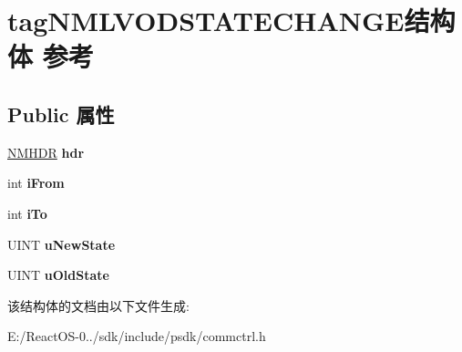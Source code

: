 \hypertarget{structtag_n_m_l_v_o_d_s_t_a_t_e_c_h_a_n_g_e}{}\section{tag\+N\+M\+L\+V\+O\+D\+S\+T\+A\+T\+E\+C\+H\+A\+N\+G\+E结构体 参考}
\label{structtag_n_m_l_v_o_d_s_t_a_t_e_c_h_a_n_g_e}
\subsection*{Public 属性}
\begin{DoxyCompactItemize}
\item 
\mbox{\label{structtag_n_m_l_v_o_d_s_t_a_t_e_c_h_a_n_g_e_af089e91bad1079a82aee94b51926b203}} 
\hyperlink{structtag_n_m_h_d_r}{N\+M\+H\+DR} {\bfseries hdr}
\item 
\mbox{\label{structtag_n_m_l_v_o_d_s_t_a_t_e_c_h_a_n_g_e_af0a5ce1acd62522e4bf8b36e53c3986a}} 
int {\bfseries i\+From}
\item 
\mbox{\label{structtag_n_m_l_v_o_d_s_t_a_t_e_c_h_a_n_g_e_a31762740bb5321a49f67c366535c8be0}} 
int {\bfseries i\+To}
\item 
\mbox{\label{structtag_n_m_l_v_o_d_s_t_a_t_e_c_h_a_n_g_e_a7a13e23022c5ca5f7f44cbc2602f03f1}} 
U\+I\+NT {\bfseries u\+New\+State}
\item 
\mbox{\label{structtag_n_m_l_v_o_d_s_t_a_t_e_c_h_a_n_g_e_aac271b32b3674100a635e5a390253280}} 
U\+I\+NT {\bfseries u\+Old\+State}
\end{DoxyCompactItemize}


该结构体的文档由以下文件生成\+:\begin{DoxyCompactItemize}
\item 
E\+:/\+React\+O\+S-\/0../sdk/include/psdk/commctrl.\+h\end{DoxyCompactItemize}
